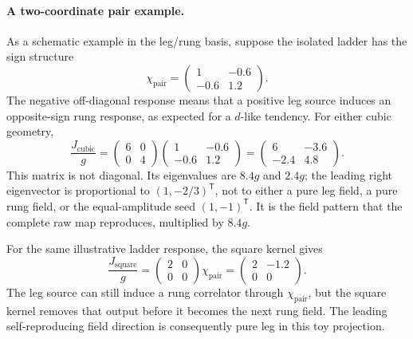 \documentclass[11pt]{article}
\begin{document}
\paragraph{A two-coordinate pair example.}
As a schematic example in the leg/rung basis, suppose the isolated ladder has
the sign structure
\begin{equation}
 \chi_{\mathrm{pair}}=
 \begin{pmatrix}1&-0.6\\-0.6&1.2\end{pmatrix}.
 \label{eq:toy-pair-susceptibility}
\end{equation}
The negative off-diagonal response means that a positive leg source induces an
opposite-sign rung response, as expected for a \(d\)-like tendency.  For either
cubic geometry,
\begin{equation}
 \frac{J_{\mathrm{cubic}}}{g}
 =\begin{pmatrix}6&0\\0&4\end{pmatrix}
  \begin{pmatrix}1&-0.6\\-0.6&1.2\end{pmatrix}
 =\begin{pmatrix}6&-3.6\\-2.4&4.8\end{pmatrix}.
 \label{eq:toy-cubic-jacobian}
\end{equation}
This matrix is not diagonal.  Its eigenvalues are \(8.4g\) and \(2.4g\); the
leading right eigenvector is proportional to
\((1,-2/3)^{\mathsf T}\), not to either a pure leg field, a pure rung field, or
the equal-amplitude seed \((1,-1)^{\mathsf T}\).  It is the field pattern that
the complete raw map reproduces, multiplied by \(8.4g\).

For the same illustrative ladder response, the square kernel gives
\begin{equation}
 \frac{J_{\mathrm{square}}}{g}
 =\begin{pmatrix}2&0\\0&0\end{pmatrix}
  \chi_{\mathrm{pair}}
 =\begin{pmatrix}2&-1.2\\0&0\end{pmatrix}.
 \label{eq:toy-square-jacobian}
\end{equation}
The leg source can still induce a rung correlator through \(\chi_{\mathrm{pair}}\),
but the square kernel removes that output before it becomes the next rung
field.  The leading self-reproducing field direction is consequently pure leg
in this toy projection.
\end{document}
